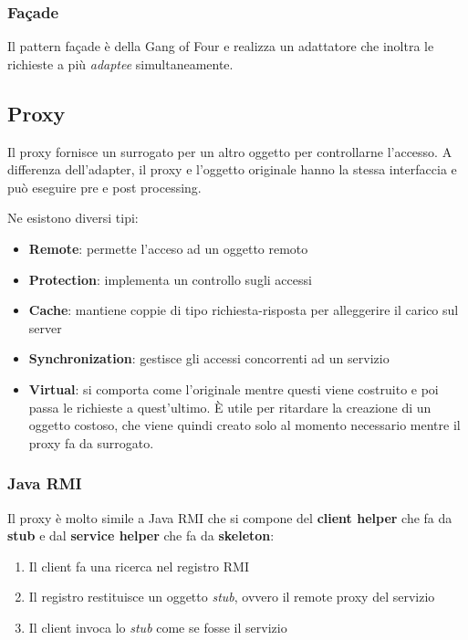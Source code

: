 \subsubsection{Façade}
Il pattern façade è della Gang of Four e realizza un adattatore che inoltra le richieste a più \textit{adaptee} simultaneamente.

\subsection{Proxy}
Il proxy fornisce un surrogato per un altro oggetto per controllarne l'accesso. A differenza dell'adapter, il proxy e l'oggetto originale hanno la stessa interfaccia e può eseguire pre e post processing.\\
\begin{figure}[!h]
	\hfill
	\hfill
	
\end{figure}

\noindent Ne esistono diversi tipi:
\begin{itemize}
	\item \textbf{Remote}: permette l'acceso ad un oggetto remoto
	\item \textbf{Protection}: implementa un controllo sugli accessi
	\item \textbf{Cache}: mantiene coppie di tipo richiesta-risposta per alleggerire il carico sul server
	\item \textbf{Synchronization}: gestisce gli accessi concorrenti ad un servizio
	\item \textbf{Virtual}: si comporta come l'originale mentre questi viene costruito e poi passa le richieste a quest'ultimo. È utile per ritardare la creazione di un oggetto costoso, che viene quindi creato solo al momento necessario mentre il proxy fa da surrogato.
\end{itemize}

\subsubsection{Java RMI}
Il proxy è molto simile a Java RMI che si compone del \textbf{client helper} che fa da \textbf{stub} e dal \textbf{service helper} che fa da \textbf{skeleton}:
\begin{enumerate}
	\item Il client fa una ricerca nel registro RMI
	\item Il registro restituisce un oggetto \textit{stub}, ovvero il remote proxy del servizio
	\item Il client invoca lo \textit{stub} come se fosse il servizio
\end{enumerate}